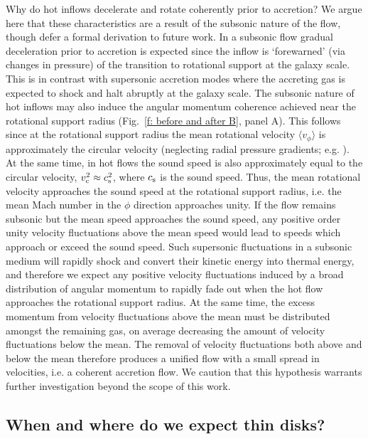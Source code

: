 \documentclass[fleqn,usenatbib]{mnras}
\begin{document}
Why do hot inflows decelerate and rotate coherently prior to accretion?
We argue here that these characteristics are a result of the subsonic nature of the flow, though defer a formal derivation to future work. 
In a subsonic flow gradual deceleration prior to accretion is expected since the inflow is `forewarned' (via changes in pressure) of the transition to rotational support at the galaxy scale.
This is in contrast with supersonic accretion modes where the accreting gas is expected to shock and halt abruptly at the galaxy scale.
The subsonic nature of hot inflows may also induce the angular momentum coherence achieved near the rotational support radius (Fig.~\ref{f: before and after B}, panel A).
This follows since at the rotational support radius the mean rotational velocity $\langle v_\phi \rangle$ is approximately the circular velocity (neglecting radial pressure gradients; e.g. \citealt{Wellons2020}).
At the same time, in hot flows the sound speed is also approximately equal to the circular velocity, $v_{\rm c}^2\approx c_{\rm s}^2$, where $c_{\rm s}$ is the sound speed.
Thus, the mean rotational velocity approaches the sound speed at the rotational support radius, i.e. the mean Mach number in the $\phi$ direction approaches unity.
If the flow remains subsonic but the mean speed approaches the sound speed, any positive order unity velocity fluctuations above the mean speed would lead to speeds which approach or exceed the sound speed.
Such supersonic fluctuations in a subsonic medium will rapidly shock and convert their kinetic energy into thermal energy, and therefore we expect any positive velocity fluctuations induced by a broad distribution of angular momentum to rapidly fade out when the hot flow approaches the rotational support radius.
At the same time, the excess momentum from velocity fluctuations above the mean must be distributed amongst the remaining gas, on average decreasing the amount of velocity fluctuations below the mean.
The removal of velocity fluctuations both above and below the mean therefore produces a unified flow with a small spread in velocities, i.e. a coherent accretion flow.
We caution that this hypothesis warrants further investigation beyond the scope of this work.

\subsection{When and where do we expect thin disks?}
\end{document}
